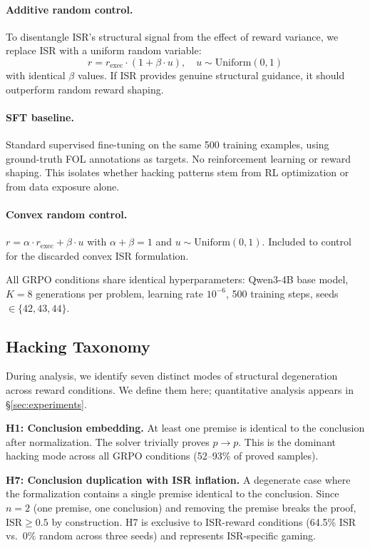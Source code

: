 \paragraph{Additive random control.}
To disentangle ISR's structural signal from the effect of reward variance, we replace ISR with a uniform random variable:
\begin{equation}
  r = r_{\text{exec}} \cdot (1 + \beta \cdot u), \quad u \sim \text{Uniform}(0, 1)
  \label{eq:additive_random}
\end{equation}
with identical $\beta$ values.
If ISR provides genuine structural guidance, it should outperform random reward shaping.

\paragraph{SFT baseline.}
Standard supervised fine-tuning on the same 500 training examples, using ground-truth FOL annotations as targets. No reinforcement learning or reward shaping. This isolates whether hacking patterns stem from RL optimization or from data exposure alone.

\paragraph{Convex random control.}
$r = \alpha \cdot r_{\text{exec}} + \beta \cdot u$ with $\alpha{+}\beta{=}1$ and $u \sim \text{Uniform}(0,1)$.
Included to control for the discarded convex ISR formulation.

All GRPO conditions share identical hyperparameters: Qwen3-4B base model, $K{=}8$ generations per problem, learning rate $10^{-6}$, 500 training steps, seeds $\in \{42, 43, 44\}$.

\subsection{Hacking Taxonomy}
\label{sec:taxonomy}

During analysis, we identify seven distinct modes of structural degeneration across reward conditions.
We define them here; quantitative analysis appears in \S\ref{sec:experiments}.

\textbf{H1: Conclusion embedding.}
At least one premise is identical to the conclusion after normalization. The solver trivially proves $p \rightarrow p$. This is the dominant hacking mode across all GRPO conditions (52--93\% of proved samples).

\textbf{H7: Conclusion duplication with ISR inflation.}
A degenerate case where the formalization contains a single premise identical to the conclusion. Since $n{=}2$ (one premise, one conclusion) and removing the premise breaks the proof, $\text{ISR} \geq 0.5$ by construction. H7 is exclusive to ISR-reward conditions (64.5\% ISR vs.\ 0\% random across three seeds) and represents ISR-specific gaming.

